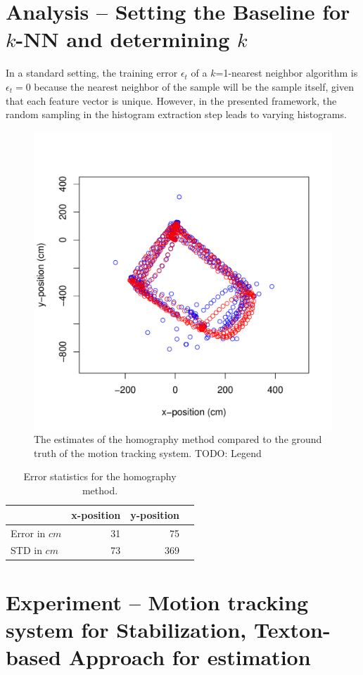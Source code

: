 \documentclass[11pt]{report}
\begin{document}
\section{Analysis -- Setting the Baseline for $k$-NN and determining
  $k$}
\label{sec:detk}

In a standard setting, the training error $\epsilon_t$ of a
$k$=1-nearest neighbor algorithm is $\epsilon_t = 0$ because the
nearest neighbor of the sample will be the sample itself, given that
each feature vector is unique. However, in the presented framework,
the random sampling in the histogram extraction step leads to varying
histograms.

\begin{figure}[h!]
\begin{center}
\includegraphics[width=0.448\columnwidth]{SIFT_vs_OptiTrack}
\caption{{\label{fig:flightpath} The estimates of the homography
    method compared to the ground truth of the motion tracking system.
    TODO: Legend%
  }}
\end{center}
\end{figure}

\begin{table}[H]
  \centering
  \begin{tabular}{lrrr}
    \toprule
    & x-position & y-position\\
    \midrule
    Error in $cm$ & 31 & 75\\
    STD in $cm$ & 73 & 369\\
    \bottomrule
  \end{tabular}
  \caption[Error statistics homography method.]{Error statistics for the homography method.}
  \label{tab:homoerror}
\end{table}


\section{Experiment -- Motion tracking system for Stabilization,
  Texton-based Approach for estimation}
\end{document}

